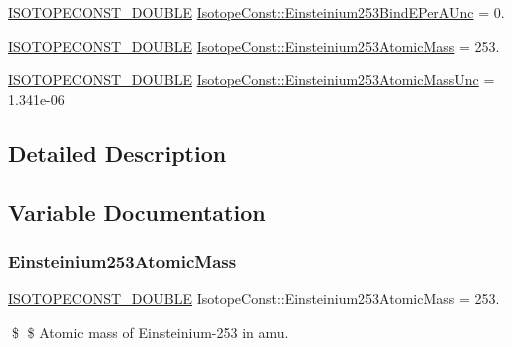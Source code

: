 \begin{DoxyCompactItemize}
\item 
\mbox{\hyperlink{group___isotope_const-_macros_ga8f45a7272ce02c0b4c65c44636ed719a}{I\+S\+O\+T\+O\+P\+E\+C\+O\+N\+S\+T\+\_\+\+D\+O\+U\+B\+LE}} \mbox{\hyperlink{group___isotope_const-_einsteinium-_es253_ga35d8ed86ae9832c14c889d1639fec0d8}{Isotope\+Const\+::\+Einsteinium253\+Bind\+E\+Per\+A\+Unc}} = 0.
\item 
\mbox{\hyperlink{group___isotope_const-_macros_ga8f45a7272ce02c0b4c65c44636ed719a}{I\+S\+O\+T\+O\+P\+E\+C\+O\+N\+S\+T\+\_\+\+D\+O\+U\+B\+LE}} \mbox{\hyperlink{group___isotope_const-_einsteinium-_es253_gaca6c2091efd79b898bf2ec527a0979d3}{Isotope\+Const\+::\+Einsteinium253\+Atomic\+Mass}} = 253.
\item 
\mbox{\hyperlink{group___isotope_const-_macros_ga8f45a7272ce02c0b4c65c44636ed719a}{I\+S\+O\+T\+O\+P\+E\+C\+O\+N\+S\+T\+\_\+\+D\+O\+U\+B\+LE}} \mbox{\hyperlink{group___isotope_const-_einsteinium-_es253_ga9eca4aa0a14b0fae421edfa6b27c426b}{Isotope\+Const\+::\+Einsteinium253\+Atomic\+Mass\+Unc}} = 1.\+341e-\/06
\end{DoxyCompactItemize}


\subsection{Detailed Description}


\subsection{Variable Documentation}
\mbox{\label{group___isotope_const-_einsteinium-_es253_gaca6c2091efd79b898bf2ec527a0979d3}} 
\subsubsection{\texorpdfstring{Einsteinium253\+Atomic\+Mass}{Einsteinium253AtomicMass}}
{\footnotesize\ttfamily \mbox{\hyperlink{group___isotope_const-_macros_ga8f45a7272ce02c0b4c65c44636ed719a}{I\+S\+O\+T\+O\+P\+E\+C\+O\+N\+S\+T\+\_\+\+D\+O\+U\+B\+LE}} Isotope\+Const\+::\+Einsteinium253\+Atomic\+Mass = 253.}

\$ \$ Atomic mass of Einsteinium-\/253 in amu. \mbox{\label{group___isotope_const-_einsteinium-_es253_ga9eca4aa0a14b0fae421edfa6b27c426b}} 
